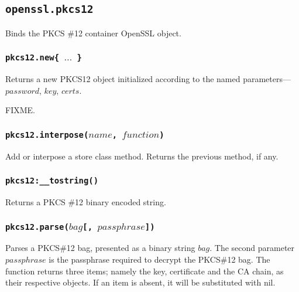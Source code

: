 \documentclass[11pt, oneside]{memoir}
\newcommand*{\fn}[1]{\texttt{#1}\xspace}
\newcounter{toccols}
\newenvironment{Module}[1]{
	\subsection{\texttt{#1}}
	\addtocontents{toc}{
		\protect\begin{multicols}{\value{toccols}}
	}
}{
	\addtocontents{toc}{\protect\end{multicols}}
}
\begin{document}
\begin{Module}{openssl.pkcs12}

Binds the PKCS \#12 container OpenSSL object.

\subsubsection[\fn{pkcs12.new}]{\fn{pkcs12.new\{ $\ldots$ \}}}

Returns a new PKCS12 object initialized according to the named parameters---$password$, $key$, $certs$.

FIXME.

\subsubsection[\fn{pkcs12.interpose}]{\fn{pkcs12.interpose($name$, $function$)}}

Add or interpose a store class method. Returns the previous method, if any.

\subsubsection[\fn{pkcs12:\_\_tostring}]{\fn{pkcs12:\_\_tostring()}}

Returns a PKCS \#12 binary encoded string.

\subsubsection[\fn{pkcs12.parse}]{\fn{pkcs12.parse($bag$[, $passphrase$])}}

Parses a PKCS\#12 bag, presented as a binary string $bag$. The second parameter $passphrase$ is the passphrase required to decrypt the PKCS\#12 bag. The function returns three items; namely the key, certificate and the CA chain, as their respective objects. If an item is absent, it will be substituted with nil.

\end{Module}
\end{document}
